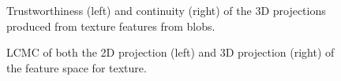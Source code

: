 \begin{figure}[H]
	\centering
	\caption{Trustworthiness (left) and continuity (right) of the 3D projections produced from texture features from blobs.}\label{fig:TC_3d_texture}
\end{figure}

\begin{figure}[H]
	\centering
	\caption{LCMC of both the 2D projection (left) and 3D projection (right) of the feature space for texture.}\label{fig:LCMC_texture}
\end{figure}
\clearpage

